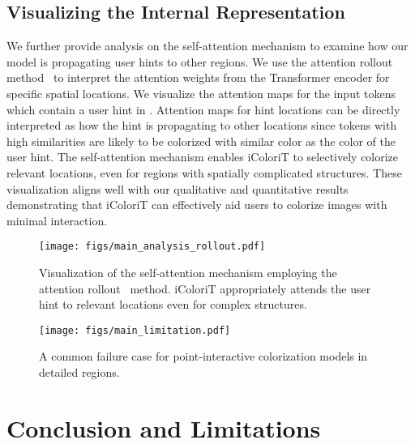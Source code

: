 \documentclass[10pt,twocolumn,letterpaper]{article}
\begin{document}
\subsection{Visualizing the Internal Representation}
\vspace{-0.1cm}
\label{sec:quali-matrix}
We further provide analysis on the self-attention mechanism to examine how our model is propagating user hints to other regions. 
We use the attention rollout method~\cite{rollout} to interpret the attention weights from the Transformer encoder for specific spatial locations. 
We visualize the attention maps for the input tokens which contain a user hint in . 
Attention maps for hint locations can be directly interpreted as how the hint is propagating to other locations since tokens with high similarities are likely to be colorized with similar color as the color of the user hint. 
The self-attention mechanism enables iColoriT to selectively colorize relevant locations, even for regions with spatially complicated structures. 
These visualization aligns well with our qualitative and quantitative results demonstrating that iColoriT can effectively aid users to colorize images with minimal interaction. 


\begin{figure}[t]
    \centering
    \texttt{[image: figs/main\_analysis\_rollout.pdf]}
    \vspace{-0.4cm}
    \caption{Visualization of the self-attention mechanism employing the attention rollout~\cite{rollout} method. iColoriT appropriately attends the user hint to relevant locations even for complex structures. }
    \label{fig:exp_rollout}
    \vspace{-0.32cm}
\end{figure}

\begin{figure}[t]
    \centering
    \texttt{[image: figs/main\_limitation.pdf]}
    \vspace{-0.5cm}
    \caption{A common failure case for point-interactive colorization models in detailed regions.}
    \label{fig:exp_failure}
    \vspace{-0.6cm}
\end{figure}

\vspace{-0.2cm}
\section{Conclusion and Limitations}
\vspace{-0.2cm}
\end{document}
